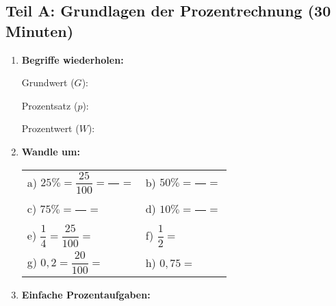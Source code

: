 \subsection*{Teil A: Grundlagen der Prozentrechnung (30 Minuten)}

\begin{enumerate}[label=\arabic*.]
    \item \textbf{Begriffe wiederholen:}
    \vspace{0.5cm}

    Grundwert ($G$): \underline{\hspace{5cm}}

    Prozentsatz ($p$): \underline{\hspace{5cm}}

    Prozentwert ($W$): \underline{\hspace{5cm}}

    \vspace{1cm}

    \item \textbf{Wandle um:}
    \vspace{0.5cm}

    \begin{tabular}{ll}
        a) $25\% = \dfrac{25}{100} = \dfrac{\phantom{00}}{\phantom{00}} = $ \underline{\hspace{2cm}} & b) $50\% = \dfrac{\phantom{00}}{\phantom{00}} = $ \underline{\hspace{2cm}} \\[4ex]
        c) $75\% = \dfrac{\phantom{00}}{\phantom{00}} = $ \underline{\hspace{2cm}} & d) $10\% = \dfrac{\phantom{00}}{\phantom{00}} = $ \underline{\hspace{2cm}} \\[4ex]
        e) $\dfrac{1}{4} = \dfrac{25}{100} = $ \underline{\hspace{2cm}} & f) $\dfrac{1}{2} = $ \underline{\hspace{2cm}} \\[4ex]
        g) $0,2 = \dfrac{20}{100} = $ \underline{\hspace{2cm}} & h) $0,75 = $ \underline{\hspace{2cm}}
    \end{tabular}

    \vspace{1cm}

    \item \textbf{Einfache Prozentaufgaben:}
    \vspace{0.5cm}


\end{enumerate}
